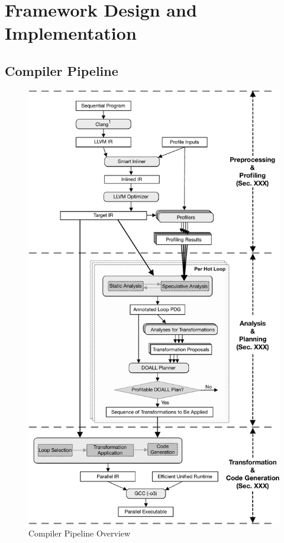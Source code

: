 \section{Framework Design and Implementation}

\subsection{Compiler Pipeline}

\begin{figure}[htp]
  \includegraphics[width=\columnwidth]{figures/compiler-pipeline-crop}
  \caption{Compiler Pipeline Overview}
  \label{fig:compiler-pipeline}
\end{figure}

